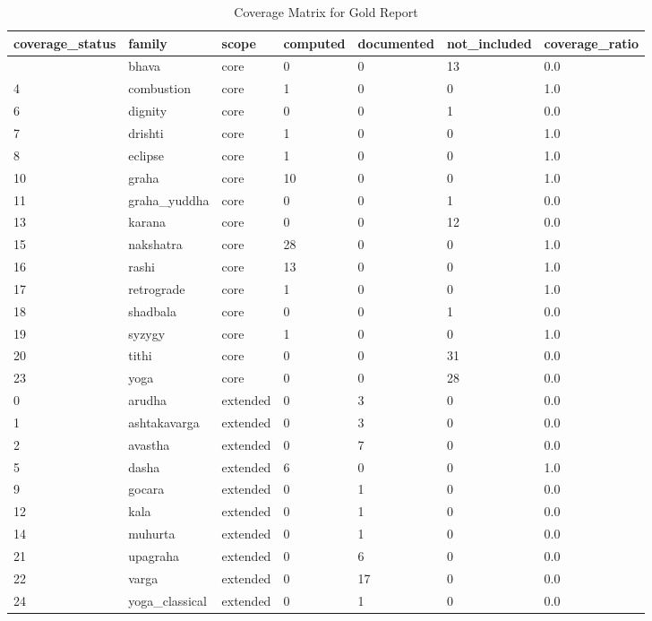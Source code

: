 \documentclass[
  11pt,
  a4paper,
  oneside,
  openany]{report}
\begin{document}
\begin{longtable}[]{@{}lllllll@{}}

\caption{\label{tbl-gold-vedic-coverage}Coverage Matrix for Gold Report}

\tabularnewline

\toprule\noalign{}
coverage\_status & family & scope & computed & documented &
not\_included & coverage\_ratio \\
\midrule\noalign{}
\endhead
\bottomrule\noalign{}
\endlastfoot
3 & bhava & core & 0 & 0 & 13 & 0.0 \\
4 & combustion & core & 1 & 0 & 0 & 1.0 \\
6 & dignity & core & 0 & 0 & 1 & 0.0 \\
7 & drishti & core & 1 & 0 & 0 & 1.0 \\
8 & eclipse & core & 1 & 0 & 0 & 1.0 \\
10 & graha & core & 10 & 0 & 0 & 1.0 \\
11 & graha\_yuddha & core & 0 & 0 & 1 & 0.0 \\
13 & karana & core & 0 & 0 & 12 & 0.0 \\
15 & nakshatra & core & 28 & 0 & 0 & 1.0 \\
16 & rashi & core & 13 & 0 & 0 & 1.0 \\
17 & retrograde & core & 1 & 0 & 0 & 1.0 \\
18 & shadbala & core & 0 & 0 & 1 & 0.0 \\
19 & syzygy & core & 1 & 0 & 0 & 1.0 \\
20 & tithi & core & 0 & 0 & 31 & 0.0 \\
23 & yoga & core & 0 & 0 & 28 & 0.0 \\
0 & arudha & extended & 0 & 3 & 0 & 0.0 \\
1 & ashtakavarga & extended & 0 & 3 & 0 & 0.0 \\
2 & avastha & extended & 0 & 7 & 0 & 0.0 \\
5 & dasha & extended & 6 & 0 & 0 & 1.0 \\
9 & gocara & extended & 0 & 1 & 0 & 0.0 \\
12 & kala & extended & 0 & 1 & 0 & 0.0 \\
14 & muhurta & extended & 0 & 1 & 0 & 0.0 \\
21 & upagraha & extended & 0 & 6 & 0 & 0.0 \\
22 & varga & extended & 0 & 17 & 0 & 0.0 \\
24 & yoga\_classical & extended & 0 & 1 & 0 & 0.0 \\

\end{longtable}
\end{document}
